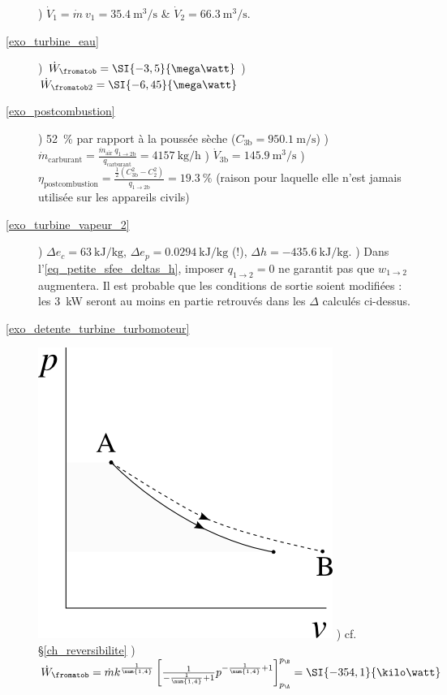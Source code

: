 \begin{description}
					) $\dot{V}_1 = \dot m \ v_1 = \SI{35,4}{\metre\cubed\per\second}$ \& $\dot{V}_2 = \SI{66,3}{\metre\cubed\per\second}$.
	\item [\ref{exo_turbine_eau}]
					) $\dot{W}_\fromatob = \SI{-3,5}{\mega\watt}$
					) $\dot{W}_{\fromatob2} = \SI{-6,45}{\mega\watt}$
	\item [\ref{exo_postcombustion}]
					) \SI{+52}{\percent} par rapport à la poussée sèche ($C_{3\text{b}} = \SI{950,1}{\metre\per\second}$)
					) $\dot{m}_\text{carburant} = \frac{\dot{m}_\text{air} \ q_{1\to 2\text{b}}}{q_\text{carburant}} = \SI[per-mode=symbol]{4157}{\kilogram\per\hour}$
					) $\dot{V}_{3\text{b}} = \SI{145,9}{\metre\cubed\per\second} $
					) $\eta_\text{postcombustion} = \frac{\frac{1}{2}\left(C_{3\text{b}}^2 - C_2^2\right)}{q_{1\to 2\text{b}}} =  \SI{19,3}{\percent}$ (raison pour laquelle elle n’est jamais utilisée sur les appareils civils)
	\item [\ref{exo_turbine_vapeur_2}]
					) $\Delta e_c = \SI{+63}{\kilo\joule\per\kilogram}$, $\Delta e_p = \SI{+0,0294}{\kilo\joule\per\kilogram}$ (!), $\Delta h = \SI{-435,6}{\kilo\joule\per\kilogram}$.
					) Dans l’\cref{eq_petite_sfee_deltas_h}, imposer $q_{1 \to 2} = 0$ ne garantit pas que $w_{1 \to 2}$ augmentera. Il est probable que les conditions de sortie soient modifiées : les \SI{3}{\kilo\watt} seront au moins en partie retrouvés dans les $\Delta$ calculés ci-dessus.
	\item [\ref{exo_detente_turbine_turbomoteur}]
					\includegraphics[width=\solutiondiagramwidth]{images/exo_sol_pv_2.png}
					) cf. \S\ref{ch_reversibilite}
					) $\dot{W}_\fromatob = \dot m k^{\frac{1}{\num{1,4}}} \left[\frac{1}{-\frac{1}{\num{1,4}} +1} p^{-\frac{1}{\num{1,4}} +1}\right]_{p_\A}^{p_\B} = \SI{-354,1}{\kilo\watt}$

\end{description}
